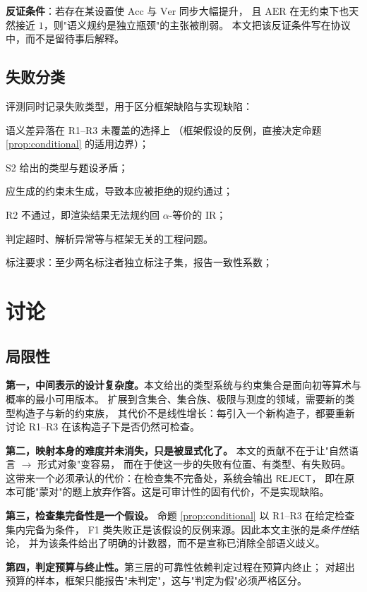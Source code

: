 \documentclass[11pt]{article}
\begin{document}
\textbf{反证条件}：若存在某设置使 $\mathrm{Acc}$ 与 $\mathrm{Ver}$ 同步大幅提升，
且 $\mathrm{AER}$ 在无约束下也天然接近 $1$，则"语义规约是独立瓶颈"的主张被削弱。
本文把该反证条件写在协议中，而不是留待事后解释。

\subsection{失败分类}
评测同时记录失败类型，用于区分框架缺陷与实现缺陷：
\begin{description}[leftmargin=1.8em,itemsep=2pt]
\item[F1 检查集外差异] 语义差异落在 R1--R3 未覆盖的选择上
（框架假设的反例，直接决定命题 \ref{prop:conditional} 的适用边界）；
\item[F2 类型分配错误] S2 给出的类型与题设矛盾；
\item[F3 约束遗漏] 应生成的约束未生成，导致本应被拒绝的规约通过；
\item[F4 渲染不可回译] R2 不通过，即渲染结果无法规约回 $\alpha$-等价的 IR；
\item[F5 实现缺陷] 判定超时、解析异常等与框架无关的工程问题。
\end{description}
标注要求：至少两名标注者独立标注子集，报告一致性系数；
\section{讨论}
\label{sec:discussion}
\subsection{局限性}
\textbf{第一，中间表示的设计复杂度。}本文给出的类型系统与约束集合是面向初等算术与概率的最小可用版本。
扩展到含集合、集合族、极限与测度的领域，需要新的类型构造子与新的约束族，
其代价不是线性增长：每引入一个新构造子，都要重新讨论 R1--R3 在该构造子下是否仍然可检查。

\textbf{第二，映射本身的难度并未消失，只是被显式化了。}
本文的贡献不在于让"自然语言 $\to$ 形式对象"变容易，
而在于使这一步的失败有位置、有类型、有失败码。
这带来一个必须承认的代价：在检查集不完备处，系统会输出 $\mathsf{REJECT}$，
即在原本可能"蒙对"的题上放弃作答。这是可审计性的固有代价，不是实现缺陷。

\textbf{第三，检查集完备性是一个假设。}
命题 \ref{prop:conditional} 以 R1--R3 在给定检查集内完备为条件，
F1 类失败正是该假设的反例来源。因此本文主张的是\emph{条件性}结论，
并为该条件给出了明确的计数器，而不是宣称已消除全部语义歧义。

\textbf{第四，判定预算与终止性。}第三层的可靠性依赖判定过程在预算内终止；
对超出预算的样本，框架只能报告"未判定"，这与"判定为假"必须严格区分。
\end{document}
